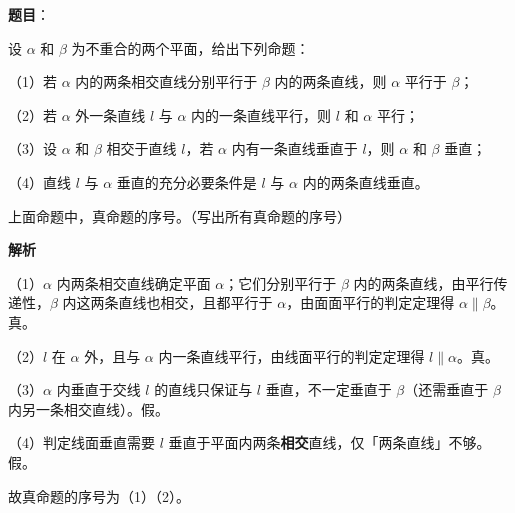 \begin{answer}

\textbf{题目}：

设 $\alpha$ 和 $\beta$ 为不重合的两个平面，给出下列命题：

（1）若 $\alpha$ 内的两条相交直线分别平行于 $\beta$ 内的两条直线，则 $\alpha$ 平行于 $\beta$；

（2）若 $\alpha$ 外一条直线 $l$ 与 $\alpha$ 内的一条直线平行，则 $l$ 和 $\alpha$ 平行；

（3）设 $\alpha$ 和 $\beta$ 相交于直线 $l$，若 $\alpha$ 内有一条直线垂直于 $l$，则 $\alpha$ 和 $\beta$ 垂直；

（4）直线 $l$ 与 $\alpha$ 垂直的充分必要条件是 $l$ 与 $\alpha$ 内的两条直线垂直。

上面命题中，真命题的序号\gkblank{}。（写出所有真命题的序号）

\textbf{解析}

（1）$\alpha$ 内两条相交直线确定平面 $\alpha$；它们分别平行于 $\beta$ 内的两条直线，由平行传递性，$\beta$ 内这两条直线也相交，且都平行于 $\alpha$，由面面平行的判定定理得 $\alpha\parallel\beta$。真。

（2）$l$ 在 $\alpha$ 外，且与 $\alpha$ 内一条直线平行，由线面平行的判定定理得 $l\parallel\alpha$。真。

（3）$\alpha$ 内垂直于交线 $l$ 的直线只保证与 $l$ 垂直，不一定垂直于 $\beta$（还需垂直于 $\beta$ 内另一条相交直线）。假。

（4）判定线面垂直需要 $l$ 垂直于平面内两条\textbf{相交}直线，仅「两条直线」不够。假。

故真命题的序号为（1）（2）。


\end{answer}
